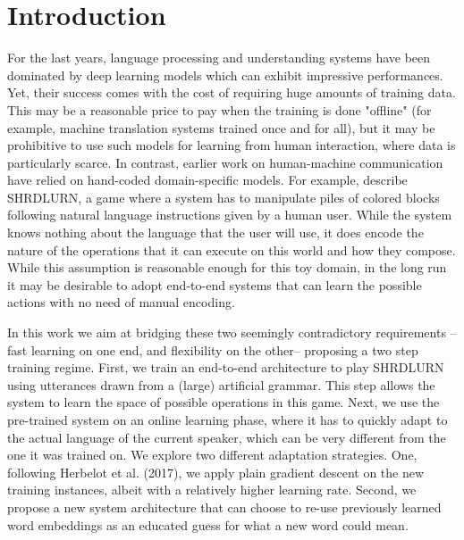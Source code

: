 \section{Introduction}

For the last years, language processing and understanding systems have been
dominated by deep learning models which can exhibit impressive performances.
Yet, their success comes with the cost of requiring huge amounts of training
data. This may be a reasonable price to pay when the training is done "offline"
(for example, machine translation systems trained once and for all), but it may
be prohibitive to use such models for learning from human interaction, where
data is particularly scarce. In contrast, earlier work on human-machine
communication have relied on hand-coded domain-specific models.  For example,
\cite{Wang:etal:2016} describe SHRDLURN, a game where a system has to manipulate
piles of colored blocks following natural language instructions given by a
human user. While the system knows nothing about the language that the user
will use, it does encode the nature of the operations that it can execute on
this world and how they compose. While this assumption is reasonable enough for
this toy domain, in the long run it may be desirable to adopt end-to-end
systems that can learn the possible actions with no need of manual encoding. 

In this work we aim at bridging these two seemingly contradictory requirements
--fast learning on one end, and flexibility on the other-- proposing a two step
training regime. First, we train an end-to-end architecture to play SHRDLURN
using utterances drawn from a (large) artificial grammar. This step allows the
system to learn the space of possible operations in this game.  Next, we use
the pre-trained system on an online learning phase, where it has to quickly
adapt to the actual language of the current speaker, which can be very
different from the one it was trained on. We explore two different adaptation
strategies. One, following Herbelot et al. (2017), we apply plain gradient
descent on the new training instances, albeit with a relatively higher learning
rate. Second, we propose a new system architecture that can choose to re-use
previously learned word embeddings as an educated guess for what a new word
could mean.  
